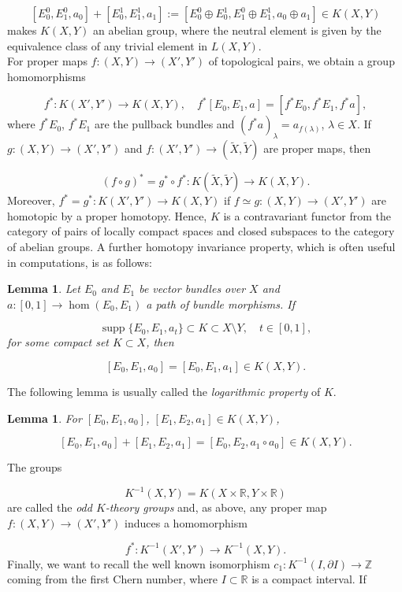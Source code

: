 \documentclass[a4paper,10pt]{article}
\newtheorem{lemma}[theorem]{Lemma}
\DeclareMathOperator{\supp}{supp}
\begin{document}
\[[E^0_0,E^0_1,a_0]+[E^1_0,E^1_1,a_1]:=[E^0_0\oplus E^1_0, E^0_1\oplus E^1_1, a_0\oplus a_1]\in K(X,Y)\]
makes $K(X,Y)$ an abelian group, where the neutral element is given by the equivalence class of any trivial element in $L(X,Y)$.\\
For proper maps $f:(X,Y)\rightarrow (X',Y')$ of topological pairs, we obtain a group homomorphisms

\[f^\ast:K(X',Y')\rightarrow K(X,Y),\quad f^\ast[E_0,E_1,a]=[f^\ast E_0,f^\ast E_1,f^\ast a],\]
where $f^\ast E_0$, $f^\ast E_1$ are the pullback bundles and $(f^\ast a)_\lambda=a_{f(\lambda)}$, $\lambda\in X$. If $g:(X,Y)\rightarrow (X',Y')$ and $f:(X',Y')\rightarrow (\tilde{X},\tilde{Y})$ are proper maps, then

\[(f\circ g)^\ast=g^\ast\circ f^\ast:K(\tilde{X},\tilde{Y})\rightarrow K(X,Y).\]
Moreover, $f^\ast=g^\ast:K(X',Y')\rightarrow K(X,Y)$ if $f\simeq g:(X,Y)\rightarrow(X',Y')$ are homotopic by a proper homotopy. Hence, $K$ is a contravariant functor from the category of pairs of locally compact spaces and closed subspaces to the category of abelian groups. A further homotopy invariance property, which is often useful in computations, is as follows:

\begin{lemma}\label{homotopyII}
Let $E_0$ and $E_1$ be vector bundles over $X$ and $a:[0,1]\rightarrow \hom(E_0,E_1)$ a path of bundle morphisms. If

\[ \supp \{E_0,E_1,a_t\}\subset K\subset X\setminus Y,\quad t\in [0,1],\]
for some compact set $K\subset X$, then

\[[E_0,E_1,a_0]=[E_0,E_1,a_1]\in K(X,Y).\] 
\end{lemma}
\noindent
The following lemma is usually called the \textit{logarithmic property} of $K$.

\begin{lemma}\label{logarithmic}
For $[E_0,E_1,a_0]$, $[E_1,E_2,a_1]\in K(X,Y)$,

\[[E_0,E_1,a_0]+[E_1,E_2,a_1]=[E_0,E_2,a_1\circ a_0]\in K(X,Y).\]
\end{lemma}
\noindent
The groups

\[K^{-1}(X,Y)=K(X\times\mathbb{R},Y\times\mathbb{R})\]
are called the \textit{odd $K$-theory groups} and, as above, any proper map $f:(X,Y)\rightarrow(X',Y')$ induces a homomorphism

\[f^\ast:K^{-1}(X',Y')\rightarrow K^{-1}(X,Y).\]
Finally, we want to recall the well known isomorphism $c_1:K^{-1}(I,\partial I)\rightarrow\mathbb{Z}$ coming from the first Chern number, where $I\subset\mathbb{R}$ is a compact interval. If 
\end{document}
